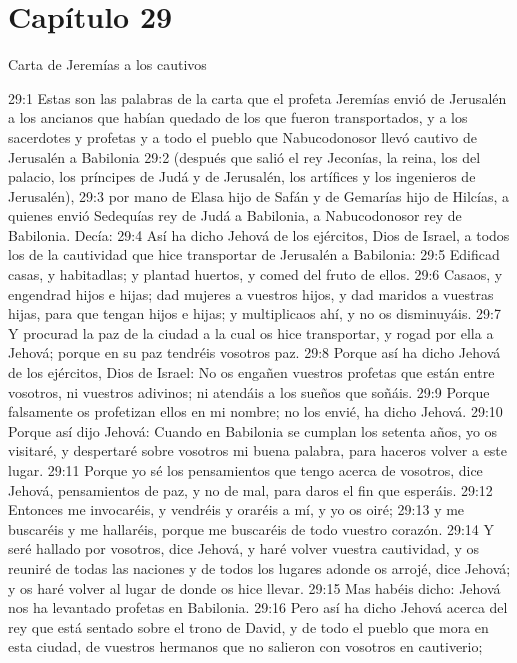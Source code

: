 \section*{Capítulo 29 }
Carta de Jeremías a los cautivos 
 
29:1 Estas son las palabras de la carta que el profeta Jeremías envió de Jerusalén a los ancianos que habían quedado de los que fueron transportados, y a los sacerdotes y profetas y a todo el pueblo que Nabucodonosor llevó cautivo de Jerusalén a Babilonia 
29:2 (después que salió el rey Jeconías, la reina, los del palacio, los príncipes de Judá y de Jerusalén, los artífices y los ingenieros de Jerusalén), 
29:3 por mano de Elasa hijo de Safán y de Gemarías hijo de Hilcías, a quienes envió Sedequías rey de Judá a Babilonia, a Nabucodonosor rey de Babilonia. Decía: 
29:4 Así ha dicho Jehová de los ejércitos, Dios de Israel, a todos los de la cautividad que hice transportar de Jerusalén a Babilonia: 
29:5 Edificad casas, y habitadlas; y plantad huertos, y comed del fruto de ellos. 
29:6 Casaos, y engendrad hijos e hijas; dad mujeres a vuestros hijos, y dad maridos a vuestras hijas, para que tengan hijos e hijas; y multiplicaos ahí, y no os disminuyáis. 
29:7 Y procurad la paz de la ciudad a la cual os hice transportar, y rogad por ella a Jehová; porque en su paz tendréis vosotros paz. 
29:8 Porque así ha dicho Jehová de los ejércitos, Dios de Israel: No os engañen vuestros profetas que están entre vosotros, ni vuestros adivinos; ni atendáis a los sueños que soñáis. 
29:9 Porque falsamente os profetizan ellos en mi nombre; no los envié, ha dicho Jehová. 
29:10 Porque así dijo Jehová: Cuando en Babilonia se cumplan los setenta años, yo os visitaré, y despertaré sobre vosotros mi buena palabra, para haceros volver a este lugar. 
29:11 Porque yo sé los pensamientos que tengo acerca de vosotros, dice Jehová, pensamientos de paz, y no de mal, para daros el fin que esperáis. 
29:12 Entonces me invocaréis, y vendréis y oraréis a mí, y yo os oiré; 
29:13 y me buscaréis y me hallaréis, porque me buscaréis de todo vuestro corazón. 
29:14 Y seré hallado por vosotros, dice Jehová, y haré volver vuestra cautividad, y os reuniré de todas las naciones y de todos los lugares adonde os arrojé, dice Jehová; y os haré volver al lugar de donde os hice llevar. 
29:15 Mas habéis dicho: Jehová nos ha levantado profetas en Babilonia. 
29:16 Pero así ha dicho Jehová acerca del rey que está sentado sobre el trono de David, y de todo el pueblo que mora en esta ciudad, de vuestros hermanos que no salieron con vosotros en cautiverio; 
